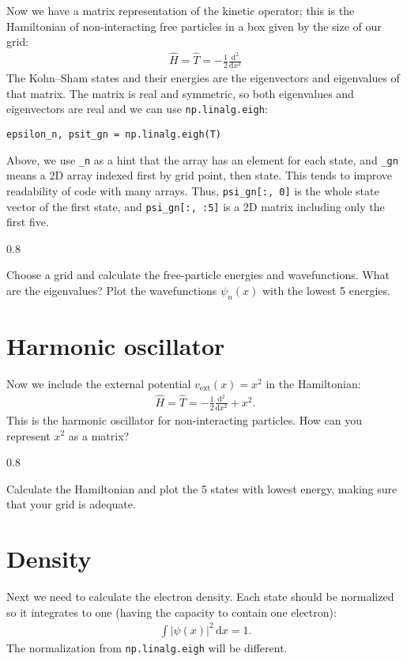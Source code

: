 \documentclass{article}
\newcommand{\exercise}[1]{
  \bigskip
  \begin{boxedminipage}[c]{0.8\linewidth}
  #1
  \end{boxedminipage}
  \bigskip
}
\newcommand{\dee}[0]{\mathrm d}
\newcommand{\idee}[0]{\,\dee}
\newcommand{\diff}[2]{\frac{\dee #1}{\dee #2}}
\begin{document}
\noindent Now we have a matrix representation of the kinetic operator; this
is the Hamiltonian of non-interacting free particles in a box given by
the size of our grid:
\begin{align}
  \hat H = \hat T = -\frac12 \diff{^2}{x^2}
\end{align}
The Kohn--Sham states and their energies are the eigenvectors and
eigenvalues of that matrix.  The matrix is real and symmetric, so both eigenvalues and eigenvectors are real and we can use
\texttt{np.linalg.eigh}:
\begin{lstlisting}
epsilon_n, psit_gn = np.linalg.eigh(T)
\end{lstlisting}
Above, we use \lstinline{_n} as a hint that the array has an element for each
state,
and \lstinline{_gn} means a 2D array indexed first by grid point, then state.
This tends to improve readability of code with many arrays.
Thus, \lstinline{psi_gn[:, 0]} is the whole state vector of the first state,
and \lstinline{psi_gn[:, :5]} is a 2D matrix including only the first five.

\exercise{
  Choose a grid and calculate the free-particle energies and wavefunctions.
  What are the eigenvalues?
  Plot the wavefunctions $\psi_n(x)$ with the lowest 5 energies.
}

\section{Harmonic oscillator}
Now we include the external potential $v_{\mathrm{ext}}(x) = x^2$ in the Hamiltonian:
\begin{align}
  \hat H = \hat T = -\frac12 \diff{^2}{x^2} + x^2.
\end{align}
This is the harmonic oscillator for non-interacting particles.
How can you represent $x^2$ as a matrix?


\exercise{
Calculate the Hamiltonian and plot the 5 states with lowest energy,
making sure that your grid is adequate.
}

\section{Density}
Next we need to calculate the electron density.
Each state should be normalized so it integrates to one (having the
capacity to contain one electron):
\begin{align}
  \int |\psi(x)|^2 \idee x = 1.
\end{align}
The normalization from \texttt{np.linalg.eigh} will be different.
\end{document}
